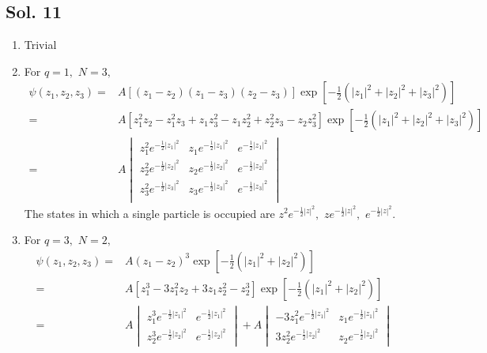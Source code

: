    \subsection*{Sol. 11}
   \begin{enumerate}
       \item Trivial
       \item 
       For $q=1,$ $N=3,$
       \begin{align*}
           \psi(z_1,z_2,z_3)
           =&
           A\left[
           (z_1-z_2)(z_1-z_3)(z_2-z_3)
           \right]
           \exp\left[
           -\frac{1}{2}
           (|z_1|^2+|z_2|^2+|z_3|^2)
           \right]\\
           =&
           A[z_1^2z_2-z_1^2z_3+z_1z_3^2-z_1z_2^2+z_2^2z_3-z_2z_3^2]
           \exp\left[
           -\frac{1}{2}
           (|z_1|^2+|z_2|^2+|z_3|^2)
           \right]\\
           =&
           A
           \begin{vmatrix}
           z_1^2e^{-\frac{1}{2}|z_1|^2} & z_1e^{-\frac{1}{2}|z_1|^2} & e^{-\frac{1}{2}|z_1|^2}\\
           z_2^2e^{-\frac{1}{2}|z_2|^2} & z_2e^{-\frac{1}{2}|z_2|^2} & e^{-\frac{1}{2}|z_2|^2}\\
           z_3^2e^{-\frac{1}{2}|z_3|^2} & z_3e^{-\frac{1}{2}|z_3|^2} & e^{-\frac{1}{2}|z_3|^2}\\
       \end{vmatrix}
       \end{align*}
       The states in which a single particle is occupied are $z^2e^{-\frac{1}{2}|z|^2},$
       $ze^{-\frac{1}{2}|z|^2},$ $e^{-\frac{1}{2}|z|^2}.$
       \item 
       For $q=3,$ $N=2,$
       \begin{align*}
           \psi(z_1,z_2,z_3)
           =&
           A
           (z_1-z_2)^3
           \exp\left[
           -\frac{1}{2}
           (|z_1|^2+|z_2|^2)
           \right]\\
           =&
           A[z_1^3-3z_1^2z_2+3z_1z_2^2-z_2^3]
           \exp\left[
           -\frac{1}{2}
           (|z_1|^2+|z_2|^2)
           \right]\\
           =&
           A
           \begin{vmatrix}
           z_1^3e^{-\frac{1}{2}|z_1|^2} & e^{-\frac{1}{2}|z_1|^2} \\
           z_2^3e^{-\frac{1}{2}|z_2|^2} & e^{-\frac{1}{2}|z_2|^2} 
       \end{vmatrix}
       +A
       \begin{vmatrix}
           -3z_1^2e^{-\frac{1}{2}|z_1|^2} & z_1e^{-\frac{1}{2}|z_1|^2} \\
           3z_2^2e^{-\frac{1}{2}|z_2|^2} & z_2e^{-\frac{1}{2}|z_2|^2} 
       \end{vmatrix}
       \end{align*}
       
       
   \end{enumerate}

